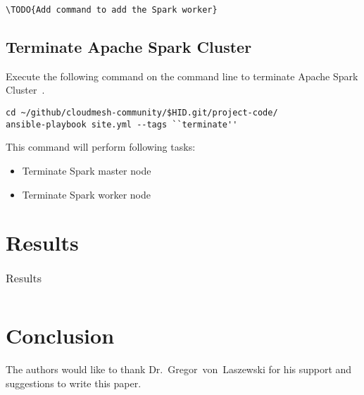 \begin{verbatim}
\TODO{Add command to add the Spark worker}
\end{verbatim}

\subsection{Terminate Apache Spark Cluster}

Execute the following command on the command line to terminate Apache
Spark Cluster~\cite{hid-sp18-511-www-spark}.

\begin{verbatim}
cd ~/github/cloudmesh-community/$HID.git/project-code/
ansible-playbook site.yml --tags ``terminate''
\end{verbatim}

This command will perform following tasks:

\begin{itemize}
	\item Terminate Spark master node
	\item Terminate Spark worker node
\end{itemize}

\section{Results}

\begin{table}[hbt]
	\centering \caption{Results}\label{t:results-table} \begin{tabular}{llll} \end{tabular}
\end{table}


\section{Conclusion}



\begin{acks}

  The authors would like to thank Dr.~Gregor~von~Laszewski for his
  support and suggestions to write this paper.

\end{acks}


 

